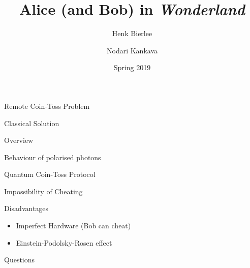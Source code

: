 \documentclass{beamer}
\title{Alice (and Bob) in \emph{Wonderland}}
\author{Henk Bierlee \and Nodari Kankava}
\institute{Uppsala University}
\date{Spring 2019}
\begin{document}
 
\frame{\titlepage}
 
\begin{frame}{Remote Coin-Toss Problem}

\end{frame}

\begin{frame}{Classical Solution}

\end{frame}

\begin{frame}{Overview}

\end{frame}

\begin{frame}{Behaviour of polarised photons}

\end{frame}

\begin{frame}{Quantum Coin-Toss Protocol}

\end{frame}

\begin{frame}{Impossibility of Cheating}

\end{frame}

\begin{frame}{Disadvantages}
\begin{itemize}
    \item Imperfect Hardware (Bob can cheat) %
    \item Einstein-Podolsky-Rosen effect
\end{itemize}
\end{frame}

\begin{frame}{Questions}

\end{frame}
 
\end{document}
